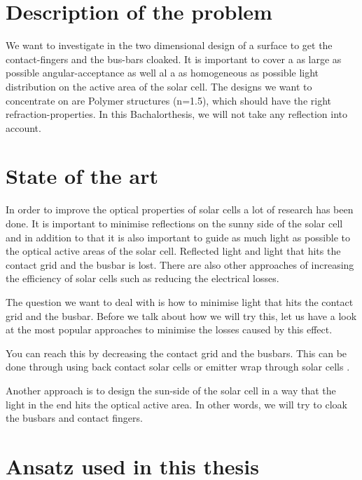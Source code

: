 \section{Description of the problem}
We want to investigate in the two dimensional design of a surface to get the contact-fingers and the bus-bars cloaked. It is important to cover  a as large as possible angular-acceptance as well al a as homogeneous as possible light distribution on the active area of the solar cell. The designs we want to concentrate on are Polymer structures (n=1.5), which should have the right refraction-properties. In this Bachalorthesis, we will not take any reflection into account. 

\section{State of the art}
In order to improve the optical properties of solar cells a lot of research has been done. It is important to minimise reflections on the sunny side of the solar cell and in addition to that it is also important to guide as much light as possible to the optical active areas of the solar cell. 
Reflected light and light that hits the contact grid and the busbar is lost. There are also other approaches of increasing the efficiency of solar cells such as reducing the electrical losses.

The question we want to deal with is how to minimise light that hits the contact grid and the busbar. Before we talk about how we will try this, let us have a look at the most popular approaches to minimise the losses caused by this effect.

You can reach this by decreasing the contact grid and the busbars. This can be done through using back contact solar cells \cite{kerschaver2006back} or emitter wrap through solar cells \cite{gee1992emitter}. 

Another approach is to design the sun-side of the solar cell in a way that the light in the end hits the optical active area. In other words, we will try to cloak the busbars and contact fingers. 

\section{Ansatz used in this thesis}

